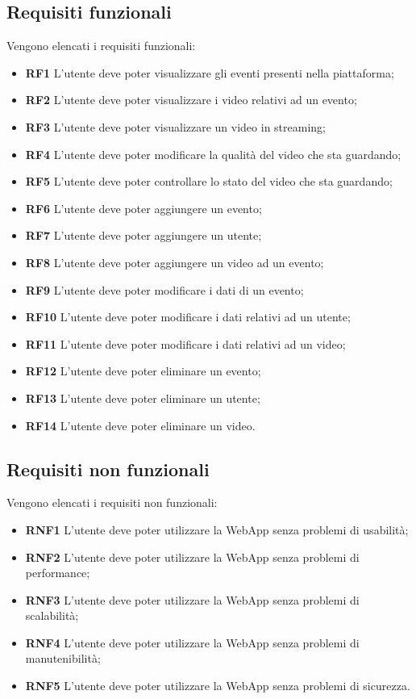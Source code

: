 \subsection{Requisiti funzionali}
\label{subsec:requisiti-funzionali}
Vengono elencati i requisiti funzionali:
\begin{itemize}
    \item \textbf{RF1} L'utente deve poter visualizzare gli eventi presenti nella piattaforma;
    \item \textbf{RF2} L'utente deve poter visualizzare i video relativi ad un evento;
    \item \textbf{RF3} L'utente deve poter visualizzare un video in streaming;
    \item \textbf{RF4} L'utente deve poter modificare la qualità del video che sta guardando;
    \item \textbf{RF5} L'utente deve poter controllare lo stato del video che sta guardando;
    \item \textbf{RF6} L'utente deve poter aggiungere un evento;
    \item \textbf{RF7} L'utente deve poter aggiungere un utente;
    \item \textbf{RF8} L'utente deve poter aggiungere un video ad un evento;
    \item \textbf{RF9} L'utente deve poter modificare i dati di un evento;
    \item \textbf{RF10} L'utente deve poter modificare i dati relativi ad un utente;
    \item \textbf{RF11} L'utente deve poter modificare i dati relativi ad un video;
    \item \textbf{RF12} L'utente deve poter eliminare un evento;
    \item \textbf{RF13} L'utente deve poter eliminare un utente;
    \item \textbf{RF14} L'utente deve poter eliminare un video.
\end{itemize}
\subsection{Requisiti non funzionali}
\label{subsec:requisiti-non-funzionali}
Vengono elencati i requisiti non funzionali:
\begin{itemize}
    \item \textbf{RNF1} L'utente deve poter utilizzare la WebApp senza problemi di usabilità;
    \item \textbf{RNF2} L'utente deve poter utilizzare la WebApp senza problemi di performance;
    \item \textbf{RNF3} L'utente deve poter utilizzare la WebApp senza problemi di scalabilità;
    \item \textbf{RNF4} L'utente deve poter utilizzare la WebApp senza problemi di manutenibilità;
    \item \textbf{RNF5} L'utente deve poter utilizzare la WebApp senza problemi di sicurezza.
\end{itemize}
